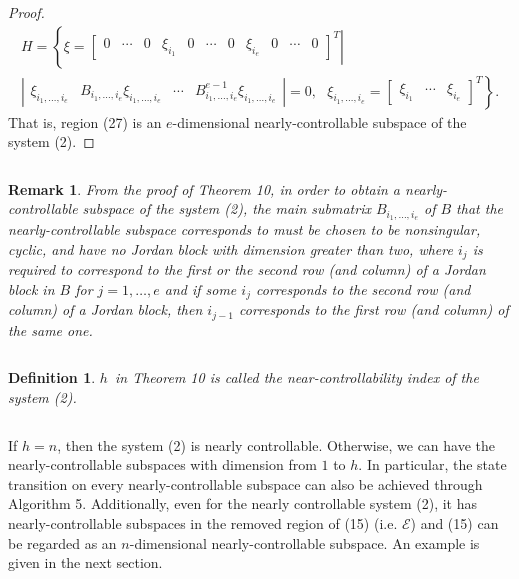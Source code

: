 \documentclass[journal,a4paper,12pt,onecolumn]{IEEEtran}
\newtheorem{definition}[theorem]{Definition}
\newtheorem{remark}[theorem]{Remark}
\begin{document}
\begin{proof}
\begin{multline*}
H=\left\{ \left. \xi =\left[
\begin{array}{ccccccccccc}
0 & \cdots & 0 & \xi _{i_{1}} & 0 & \cdots & 0 & \xi _{i_{e}} & 0 & \cdots &
0\end{array}\right] ^{T}\right\vert \right. \\
\left. \left\vert
\begin{array}{cccc}
\xi _{i_{1},\ldots ,i_{e}} & B_{i_{1},\ldots ,i_{e}}\xi _{i_{1},\ldots
,i_{e}} & \cdots & B_{i_{1},\ldots ,i_{e}}^{e-1}\xi _{i_{1},\ldots ,i_{e}}\end{array}\right\vert =0,\text{ }\xi _{i_{1},\ldots ,i_{e}}=\left[
\begin{array}{ccc}
\xi _{i_{1}} & \cdots & \xi _{i_{e}}\end{array}\right] ^{T}\right\} .
\end{multline*}That is, region (27) is an $e$-dimensional nearly-controllable subspace of
the system (2).
\end{proof}

$\left. {}\right. $

\begin{remark}
From the proof of Theorem 10, in order to obtain a nearly-controllable
subspace of the system (2), the main submatrix $B_{i_{1},\ldots ,i_{e}}$ of $B$ that the nearly-controllable subspace corresponds to must be chosen to be
nonsingular, cyclic, and have no Jordan block with dimension greater than
two, where $i_{j}$ is required to correspond to the first or the second row
(and column) of a Jordan block in $B$ for $j=1,\ldots ,e$ and if some $i_{j}$
corresponds to the second row (and column) of a Jordan block, then $i_{j-1}$
corresponds to the first row (and column) of the same one.
\end{remark}

$\left. {}\right. $

\begin{definition}
$h$\ in Theorem 10 is called the near-controllability index of the system
(2).
\end{definition}

$\left. {}\right. $

If $h=n$, then the system (2) is nearly controllable. Otherwise, we can have
the nearly-controllable subspaces with dimension from $1$ to $h$. In
particular, the state transition on every nearly-controllable subspace can
also be achieved through Algorithm 5. Additionally, even for the nearly
controllable system (2), it has nearly-controllable subspaces in the removed
region of (15) (i.e. $\mathcal{E}$) and (15) can be regarded as an $n$-dimensional nearly-controllable subspace. An example is given in the next
section.
\end{document}
